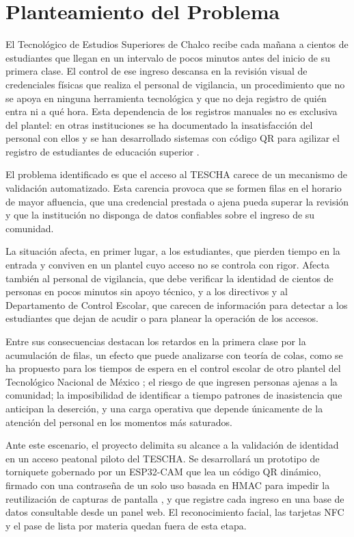 \documentclass[stu,11pt,floatsintext,biblatex]{apa7}
\begin{document}
\section{Planteamiento del Problema}
El Tecnológico de Estudios Superiores de Chalco recibe cada mañana a cientos
de estudiantes que llegan en un intervalo de pocos minutos antes del inicio de
su primera clase. El control de ese ingreso descansa en la revisión visual de
credenciales físicas que realiza el personal de vigilancia, un procedimiento
que no se apoya en ninguna herramienta tecnológica y que no deja registro de
quién entra ni a qué hora. Esta dependencia de los registros manuales no es
exclusiva del plantel: en otras instituciones se ha documentado la
insatisfacción del personal con ellos \parencite{torres2019qr} y se han
desarrollado sistemas con código QR para agilizar el registro de estudiantes
de educación superior \parencite{cano2026sistema}.

El problema identificado es que el acceso al TESCHA carece de un mecanismo de
validación automatizado. Esta carencia provoca que se formen filas en el
horario de mayor afluencia, que una credencial prestada o ajena pueda superar
la revisión y que la institución no disponga de datos confiables sobre el
ingreso de su comunidad.

La situación afecta, en primer lugar, a los estudiantes, que pierden tiempo en
la entrada y conviven en un plantel cuyo acceso no se controla con rigor. Afecta
también al personal de vigilancia, que debe verificar la identidad de cientos
de personas en pocos minutos sin apoyo técnico, y a los directivos y al
Departamento de Control Escolar, que carecen de información para detectar a
los estudiantes que dejan de acudir o para planear la operación de los
accesos.

Entre sus consecuencias destacan los retardos en la primera clase por la
acumulación de filas, un efecto que puede analizarse con teoría de colas, como
se ha propuesto para los tiempos de espera en el control escolar de otro
plantel del Tecnológico Nacional de México \parencite{talavera2025espera}; el riesgo de que ingresen personas ajenas a la
comunidad; la imposibilidad de identificar a tiempo patrones de inasistencia
que anticipan la deserción, y una carga operativa que depende únicamente de
la atención del personal en los momentos más saturados.

Ante este escenario, el proyecto delimita su alcance a la validación de
identidad en un acceso peatonal piloto del TESCHA. Se desarrollará un prototipo
de torniquete gobernado por un ESP32-CAM que lea un código QR dinámico,
firmado con una contraseña de un solo uso basada en HMAC para impedir la
reutilización de capturas de pantalla \parencite{subpratatsavee2015hmac}, y que
registre cada ingreso en una base de datos consultable desde un panel web. El
reconocimiento facial, las tarjetas NFC y el pase de lista por materia quedan
fuera de esta etapa.
\end{document}
